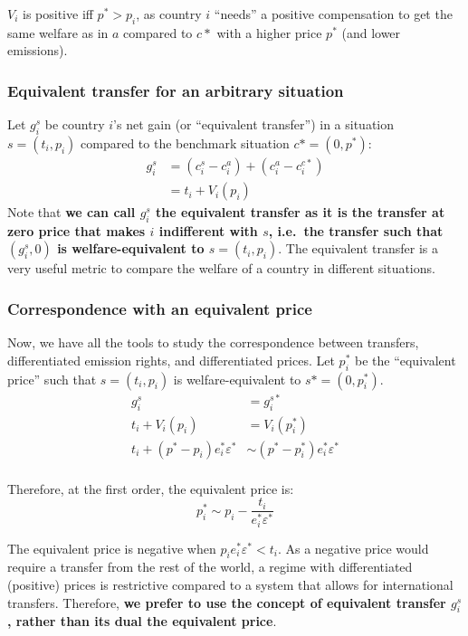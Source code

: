 \documentclass[12pt,english]{article}
\begin{document}

$V_i$ is positive iff $p^* > p_i$, as country $i$ ``needs'' a positive compensation to get the same welfare as in $a$ compared to $c*$ with a higher price $p^*$ (and lower emissions).

\subsubsection*{Equivalent transfer for an arbitrary
situation}\label{equivalent-transfer-for-an-arbitrary-situation}

Let $g^s_i$ be country $i$'s net gain (or ``equivalent transfer'') in a situation $s=(t_i, p_i)$ compared to the benchmark situation $c*=(0,p^*)$: 
$$\begin{aligned}
g^s_i &= (c^s_i - c^a_i) + (c^a_i - c^{c*}_i) \\
 &= t_i + V_i(p_i)
\end{aligned}$$ 
Note that \textbf{we can call $g^s_i$ the equivalent transfer as it is the transfer at zero price that makes $i$ indifferent with $s$, i.e.~the transfer such that $(g^s_i, 0)$ is welfare-equivalent to $s=(t_i, p_i)$}. The equivalent transfer is a very useful metric to compare the welfare of a country in different situations.

\subsubsection*{Correspondence with an equivalent
price}\label{correspondence-with-an-equivalent-price}

Now, we have all the tools to study the correspondence between transfers, differentiated emission rights, and differentiated prices.
Let $p^*_i$ be the ``equivalent price'' such that $s=(t_i, p_i)$ is welfare-equivalent to $s*=(0, p^*_i)$. $$\begin{aligned}
g^s_i &= g^{s*}_i \\
t_i + V_i(p_i) &= V_i(p^*_i) \\
t_i + (p^* - p_i) e^*_i  \varepsilon^* &\sim (p^* - p^*_i) e^*_i  \varepsilon^* \\
\end{aligned}$$

Therefore, at the first order, the equivalent price is:
$$p^*_i \sim p_i - \frac{t_i}{e^*_i  \varepsilon^* } $$

The equivalent price is negative when $p_i e^*_i  \varepsilon^* < t_i$. As a negative price would require a transfer from the rest of the world, a regime with differentiated (positive) prices is restrictive compared to a system that allows for international transfers. Therefore, \textbf{we prefer to use the concept of equivalent transfer $g^s_i$, rather than its dual the equivalent price}. 
\end{document}
